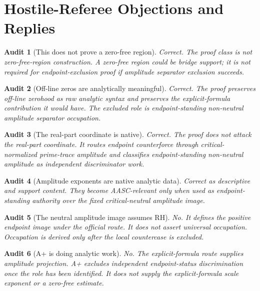 \documentclass[11pt]{article}
\newtheorem{audit}{Audit}[section]
\begin{document}
\section{Hostile-Referee Objections and Replies}

\begin{audit}[This does not prove a zero-free region]
Correct.  The proof class is not zero-free-region construction.  A zero-free region could be bridge support; it is not required for endpoint-exclusion proof if amplitude separator exclusion succeeds.
\end{audit}

\begin{audit}[Off-line zeros are analytically meaningful]
Correct.  The proof preserves off-line zerohood as raw analytic syntax and preserves the explicit-formula contribution it would have.  The excluded role is endpoint-standing non-neutral amplitude separator occupation.
\end{audit}

\begin{audit}[The real-part coordinate is native]
Correct.  The proof does not attack the real-part coordinate.  It routes endpoint counterforce through critical-normalized prime-trace amplitude and classifies endpoint-standing non-neutral amplitude as independent discriminator work.
\end{audit}

\begin{audit}[Amplitude exponents are native analytic data]
Correct as descriptive and support content.  They become AASC-relevant only when used as endpoint-standing authority over the fixed critical-neutral amplitude image.
\end{audit}

\begin{audit}[The neutral amplitude image assumes RH]
No.  It defines the positive endpoint image under the official route.  It does not assert universal occupation.  Occupation is derived only after the local countercase is excluded.
\end{audit}

\begin{audit}[A+ is doing analytic work]
No.  The explicit-formula route supplies amplitude projection.  A+ excludes independent endpoint-status discrimination once the role has been identified.  It does not supply the explicit-formula scale exponent or a zero-free estimate.
\end{audit}
\end{document}
